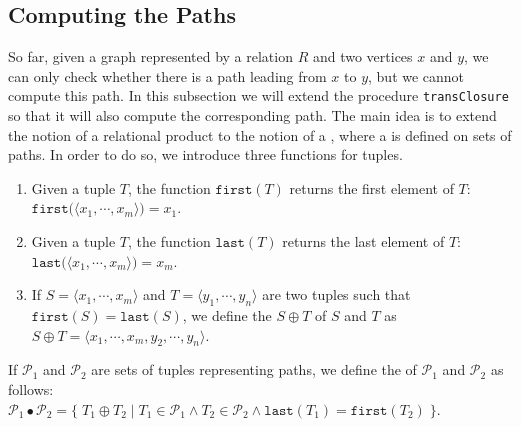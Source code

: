 \subsection{Computing the Paths}
So far, given a graph represented by a relation $R$ and two vertices $x$ and $y$, we can only check
whether there is a path leading from $x$ to $y$, but we cannot compute this path.  In this
subsection we will extend the procedure \texttt{transClosure} so that it will also compute the
corresponding path.  The main idea is to extend the notion of a relational product to the notion of
a , where a  is defined on sets of paths.  In order to do so,
we introduce three functions for tuples.
\begin{enumerate}
\item Given a tuple $T$, the function $\texttt{first}(T)$ returns the first element of $T$: 
      \\[0.2cm]
      \hspace*{1.3cm}
      $\texttt{first}\bigl(\langle x_1,\cdots,x_m\rangle\bigr) = x_1$.
\item Given a tuple $T$, the function $\texttt{last}(T)$ returns the last element of $T$: 
      \\[0.2cm]
      \hspace*{1.3cm}
      $\texttt{last}\bigl(\langle x_1,\cdots,x_m\rangle\bigl) = x_m$.
\item If $S = \langle x_1, \cdots, x_m\rangle$ and $T = \langle y_1, \cdots, y_n \rangle$ are two tuples  such that
      $\texttt{first}(S) = \texttt{last}(S)$, we define the  $S \oplus T$ of $S$ and $T$ as \\[0.2cm]
      \hspace*{1.3cm}
      $S \oplus T = \langle x_1, \cdots, x_m, y_2, \cdots, y_n \rangle$.
\end{enumerate}
If $\mathcal{P}_1$ and $\mathcal{P}_2$ are sets of tuples representing paths, we define the  of
$\mathcal{P}_1$ and $\mathcal{P}_2$ as follows: \\[0.2cm]
\hspace*{1.3cm} 
$\mathcal{P}_1 \bullet \mathcal{P}_2 = 
\bigl\{\; T_1 \oplus T_2 \mid T_1 \in \mathcal{P}_1 \wedge T_2 \in \mathcal{P}_2 \wedge \texttt{last}(T_1) = \texttt{first}(T_2) \;\bigr\}
$.

